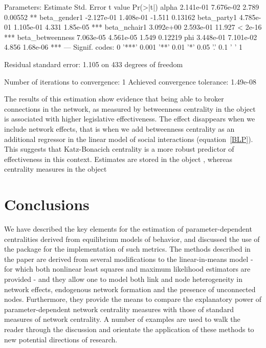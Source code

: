 \documentclass[nojss]{jss}
\begin{document}
\begin{CodeChunk}
\begin{CodeOutput}
Parameters:
Estimate Std. Error t value Pr(>|t|)    
alpha             2.141e-01  7.676e-02   2.789  0.00552 ** 
beta_gender1     -2.127e-01  1.408e-01  -1.511  0.13162    
beta_party1       4.785e-01  1.105e-01   4.331 1.85e-05 ***
beta_nchair1      3.092e+00  2.593e-01  11.927  < 2e-16 ***
beta_betweenness  7.063e-05  4.561e-05   1.549  0.12219    
phi               3.448e-01  7.101e-02   4.856 1.68e-06 ***
---
Signif. codes:  0 '***' 0.001 '**' 0.01 '*' 0.05 '.' 0.1 ' ' 1

Residual standard error: 1.105 on 433 degrees of freedom

Number of iterations to convergence: 1 
Achieved convergence tolerance: 1.49e-08
\end{CodeOutput}
\end{CodeChunk}

The results of this estimation show evidence that being able to broker connections in the network, as measured by betweenness centrality in the object 
is associated with higher legislative effectiveness. The effect disappears when we include network effects, that is when we add betweenness centrality as an additional regressor in the linear model of social interactions (equation~\ref{BLP}). This suggests that Katz-Bonacich centrality is a more robust predictor of effectiveness in this context. Estimates are stored in the object , whereas centrality measures in the object 

\section{Conclusions}

We have described the key elements for the estimation of parameter-dependent centralities derived from equilibrium models of behavior, and discussed the use of the package  for the implementation of such metrics. The methods described in the paper are derived from several modifications to the linear-in-means model - for which both nonlinear least squares
and maximum likelihood estimators are provided - and they allow one to model both link and node heterogeneity in network effects, endogenous network formation and the presence of unconnected nodes. Furthermore, they provide the means to compare the explanatory power of parameter-dependent network centrality measures with those of standard measures of network
centrality. A number of examples are used to walk the reader through the discussion and orientate the application of these methods to new potential directions of research.
\newpage

\end{document}
